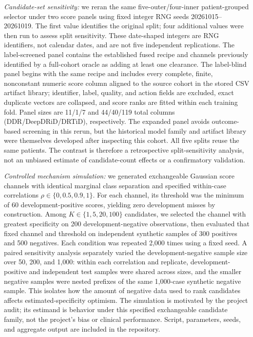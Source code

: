 \documentclass{ieeeaccess}
\begin{document}
\textit{Candidate-set sensitivity:} we reran the same five-outer/four-inner patient-grouped selector under two score panels using fixed integer RNG seeds 20261015--20261019. The first value identifies the original split; four additional values were then run to assess split sensitivity. These date-shaped integers are RNG identifiers, not calendar dates, and are not five independent replications. The label-screened panel contains the established fused recipe and channels previously identified by a full-cohort oracle as adding at least one clearance. The label-blind panel begins with the same recipe and includes every complete, finite, nonconstant numeric score column aligned to the source cohort in the stored CSV artifact library; identifier, label, quality, and action fields are excluded, exact duplicate vectors are collapsed, and score ranks are fitted within each training fold. Panel sizes are 11/1/7 and 44/40/119 total columns (DDR/DeepDRiD/DRTiD), respectively. The expanded panel avoids outcome-based screening in this rerun, but the historical model family and artifact library were themselves developed after inspecting this cohort. All five splits reuse the same patients. The contrast is therefore a retrospective split-sensitivity analysis, not an unbiased estimate of candidate-count effects or a confirmatory validation.

\textit{Controlled mechanism simulation:} we generated exchangeable Gaussian score channels with identical marginal class separation and specified within-case correlations $\rho\in\{0,0.5,0.9,1\}$. For each channel, its threshold was the minimum of 60 development-positive scores, yielding zero development misses by construction. Among $K\in\{1,5,20,100\}$ candidates, we selected the channel with greatest specificity on 200 development-negative observations, then evaluated that fixed channel and threshold on independent synthetic samples of 300 positives and 500 negatives. Each condition was repeated 2,000 times using a fixed seed. A paired sensitivity analysis separately varied the development-negative sample size over 50, 200, and 1,000: within each correlation and replicate, development-positive and independent test samples were shared across sizes, and the smaller negative samples were nested prefixes of the same 1,000-case synthetic negative sample. This isolates how the amount of negative data used to rank candidates affects estimated-specificity optimism. The simulation is motivated by the project audit; its estimand is behavior under this specified exchangeable candidate family, not the project's bias or clinical performance. Script, parameters, seeds, and aggregate output are included in the repository.
\end{document}
